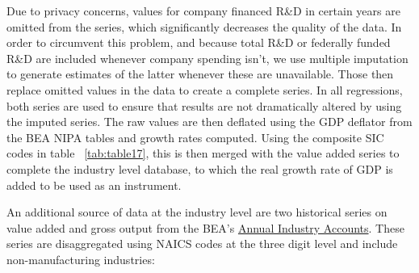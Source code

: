\documentclass{_latex/house}
\begin{document}
Due to privacy concerns, values for company financed R\&D in certain years are omitted from the series, which significantly decreases the quality of the data. In order to circumvent this problem, and because total R\&D or federally funded R\&D are included whenever company spending isn't, we use multiple imputation to generate estimates of the latter whenever these are unavailable. Those then replace omitted values in the data to create a complete series. In all regressions, both series are used to ensure that results are not dramatically altered by using the imputed series. The raw values are then deflated using the GDP deflator from the BEA NIPA tables and growth rates computed. Using the composite SIC codes in table ~\ref{tab:table17}, this is then merged with the value added series to complete the industry level database, to which the real growth rate of GDP is added to be used as an instrument.

An additional source of data at the industry level are two historical series on value added and gross output from the BEA's \href{http://www.bea.gov/industry/index.htm#annual}{Annual Industry Accounts}. These series are disaggregated using NAICS codes at the three digit level and include non-manufacturing industries:
\end{document}
